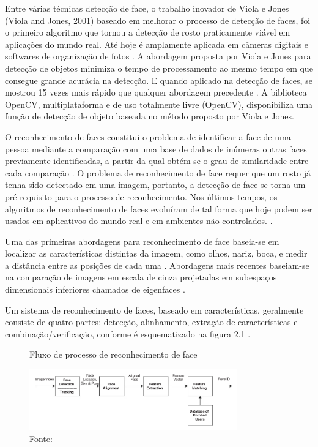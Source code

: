Entre várias técnicas detecção de face, o trabalho inovador de Viola e Jones (Viola and Jones, 2001) baseado em melhorar o processo de detecção de faces, foi o primeiro algoritmo que tornou a detecção de rosto praticamente viável em aplicações do mundo real. Até hoje é amplamente aplicada em câmeras digitais e softwares de organização de fotos \cite{Zafeiriou2015}. A abordagem proposta por Viola e Jones para detecção de objetos minimiza o tempo de processamento ao mesmo tempo em que consegue grande acurácia na detecção. E quando aplicado na detecção de faces, se mostrou 15 vezes mais rápido que qualquer abordagem precedente \cite{Viola2001}. A biblioteca OpenCV, multiplataforma e de uso totalmente livre (OpenCV),  disponibiliza uma função de detecção de objeto baseada no método proposto por Viola e Jones.

O reconhecimento de faces constitui o problema de identificar a face de uma pessoa mediante a comparação com uma base de dados de inúmeras outras faces previamente identificadas, a partir da qual obtém-se o grau de similaridade entre cada comparação \cite{Quirita2014}. O problema de reconhecimento de face requer que um rosto já tenha sido detectado em uma imagem, portanto, a detecção de face se torna um pré-requisito para o processo de reconhecimento. Nos últimos tempos, os algoritmos de reconhecimento de faces evoluíram de tal forma que hoje podem ser usados em aplicativos do mundo real e em ambientes não controlados. \cite{Zafeiriou2015}.

Uma das primeiras abordagens para reconhecimento de face baseia-se em localizar as características distintas da imagem, como olhos, nariz, boca, e medir a distância entre as posições de cada uma \cite{Fischler1973, Kanade1977}. Abordagens mais recentes baseiam-se na comparação de imagens em escala de cinza projetadas em subespaços dimensionais inferiores chamados de eigenfaces \cite{Szeliski2011}.

Um sistema de reconhecimento de faces, baseado em características, geralmente consiste de quatro partes: detecção, alinhamento, extração de características e combinação/verificação, conforme é esquematizado na figura 2.1 \cite{StanZ.Li2011}.

\begin{figure}[h]
    \centering
    \caption[Fluxo de processo de reconhecimento de face.]{Fluxo de processo de reconhecimento de face }
    \includegraphics[width=0.8\textwidth]{Cap2_Revisao_Teorica/Figures/fluxo_rec.png}
    \caption*{Fonte: \cite{StanZ.Li2011}}
    \label{fig:fluxoReconhecimento}
\end{figure}

